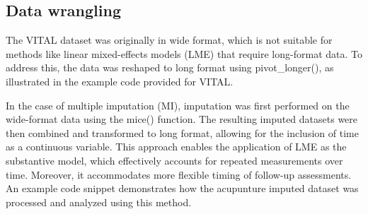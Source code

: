 \documentclass{article}
\newenvironment{Shaded}{\begin{snugshade}}{\end{snugshade}}
\newcommand{\AttributeTok}[1]{\textcolor[rgb]{0.13,0.29,0.53}{#1}}
\newcommand{\CommentTok}[1]{\textcolor[rgb]{0.56,0.35,0.01}{\textit{#1}}}
\newcommand{\ControlFlowTok}[1]{\textcolor[rgb]{0.13,0.29,0.53}{\textbf{#1}}}
\newcommand{\DecValTok}[1]{\textcolor[rgb]{0.00,0.00,0.81}{#1}}
\newcommand{\FunctionTok}[1]{\textcolor[rgb]{0.13,0.29,0.53}{\textbf{#1}}}
\newcommand{\NormalTok}[1]{#1}
\newcommand{\OtherTok}[1]{\textcolor[rgb]{0.56,0.35,0.01}{#1}}
\newcommand{\SpecialCharTok}[1]{\textcolor[rgb]{0.81,0.36,0.00}{\textbf{#1}}}
\newcommand{\StringTok}[1]{\textcolor[rgb]{0.31,0.60,0.02}{#1}}
\begin{document}
\subsection{Data wrangling}\label{data-wrangling}

The VITAL dataset was originally in wide format, which is not suitable
for methods like linear mixed-effects models (LME) that require
long-format data. To address this, the data was reshaped to long format
using pivot\_longer(), as illustrated in the example code provided for
VITAL.

\begin{Shaded}
\end{Shaded}

In the case of multiple imputation (MI), imputation was first performed
on the wide-format data using the mice() function. The resulting imputed
datasets were then combined and transformed to long format, allowing for
the inclusion of time as a continuous variable. This approach enables
the application of LME as the substantive model, which effectively
accounts for repeated measurements over time. Moreover, it accommodates
more flexible timing of follow-up assessments. An example code snippet
demonstrates how the acupunture imputed dataset was processed and
analyzed using this method.
\end{document}
